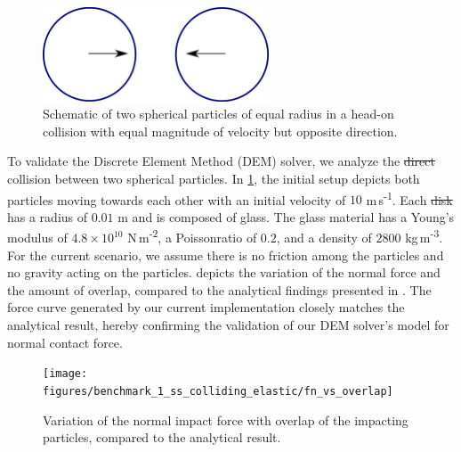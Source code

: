 \documentclass[preprint,12pt]{elsarticle}
\providecommand{\DIFaddtex}[1]{{\protect\color{blue}\uwave{#1}}} %
\providecommand{\DIFdeltex}[1]{{\protect\color{red}\sout{#1}}}                      %
\providecommand{\DIFaddbegin}{} %
\providecommand{\DIFaddend}{} %
\providecommand{\DIFdelbegin}{} %
\providecommand{\DIFdelend}{} %
\providecommand{\DIFaddbeginFL}{} %
\providecommand{\DIFaddendFL}{} %
\providecommand{\DIFdelbeginFL}{} %
\providecommand{\DIFdelendFL}{} %
\providecommand{\DIFadd}[1]{\texorpdfstring{\DIFaddtex{#1}}{#1}} %
\providecommand{\DIFdel}[1]{\texorpdfstring{\DIFdeltex{#1}}{}} %
\newcommand{\DIFscaledelfig}{0.5}
\newlength{\DIFdelgraphicswidth} %
\newlength{\DIFdelgraphicsheight} %
\newcommand{\DIFaddincludegraphics}[2][]{{\color{blue}\fbox{\DIFOincludegraphics[#1]{#2}}}} %
\newcommand{\DIFdelincludegraphics}[2][]{%
\sbox{\DIFdelgraphicsbox}{\DIFOincludegraphics[#1]{#2}}%
\settoboxwidth{\DIFdelgraphicswidth}{\DIFdelgraphicsbox} %
\settoboxtotalheight{\DIFdelgraphicsheight}{\DIFdelgraphicsbox} %
\scalebox{\DIFscaledelfig}{%
\parbox[b]{\DIFdelgraphicswidth}{\usebox{\DIFdelgraphicsbox}\\[-\baselineskip] \rule{\DIFdelgraphicswidth}{0em}}\llap{\resizebox{\DIFdelgraphicswidth}{\DIFdelgraphicsheight}{%
\setlength{\unitlength}{\DIFdelgraphicswidth}%
\begin{picture}(1,1)%
\thicklines\linethickness{2pt} %
{\color[rgb]{1,0,0}\put(0,0){\framebox(1,1){}}}%
{\color[rgb]{1,0,0}\put(0,0){\line( 1,1){1}}}%
{\color[rgb]{1,0,0}\put(0,1){\line(1,-1){1}}}%
\end{picture}%
}\hspace*{3pt}}} %
} %
\DeclareRobustCommand{\DIFaddbegin}{\DIFOaddbegin \let\includegraphics\DIFaddincludegraphics} %
\DeclareRobustCommand{\DIFaddend}{\DIFOaddend \let\includegraphics\DIFOincludegraphics} %
\DeclareRobustCommand{\DIFdelbegin}{\DIFOdelbegin \let\includegraphics\DIFdelincludegraphics} %
\DeclareRobustCommand{\DIFdelend}{\DIFOaddend \let\includegraphics\DIFOincludegraphics} %
\DeclareRobustCommand{\DIFaddbeginFL}{\DIFOaddbeginFL \let\includegraphics\DIFaddincludegraphics} %
\DeclareRobustCommand{\DIFaddendFL}{\DIFOaddendFL \let\includegraphics\DIFOincludegraphics} %
\DeclareRobustCommand{\DIFdelbeginFL}{\DIFOdelbeginFL \let\includegraphics\DIFdelincludegraphics} %
\DeclareRobustCommand{\DIFdelendFL}{\DIFOaddendFL \let\includegraphics\DIFOincludegraphics} %
\begin{document}
\begin{figure}[!htpb]
  \centering
  \includegraphics[width=0.6\textwidth]{images/results_dem_1_validation_particle_particle_impact/dem_01_head_on_schematic}
  \caption{Schematic of two spherical particles of equal radius in a
    head-on collision with equal magnitude of velocity but opposite direction.}
  \label{fig:result:dem_1_schematic}
\end{figure}
To validate the Discrete Element Method (DEM) solver, we analyze the \DIFdelbegin \DIFdel{direct
}\DIFdelend \DIFaddbegin \DIFadd{normal
}\DIFaddend collision between two spherical particles.  In
\cref{fig:result:dem_1_schematic}, the initial setup depicts both particles
moving towards each other with an initial velocity of $10$
m\,s\textsuperscript{-1}.  Each \DIFdelbegin \DIFdel{disk }\DIFdelend \DIFaddbegin \DIFadd{particle }\DIFaddend has a radius of $0.01$ m and is composed
of glass. The glass material has a Young's modulus of $4.8 \times 10^{10}$
N\,m\textsuperscript{-2}, a Poisson\DIFaddbegin \DIFadd{'s }\DIFaddend ratio of $0.2$, and a density of \DIFdelbegin \DIFdel{$2800$
}\DIFdelend \DIFaddbegin \DIFadd{$2,800$
}\DIFaddend kg\,m\textsuperscript{-3}.  For the current scenario, we assume there is no
friction among the particles and no gravity acting on the particles.
 depicts the variation of the normal
force and the amount of overlap, compared to the analytical findings presented
in \cite{chung2011benchmark}. The force curve generated by our current
implementation closely matches the analytical result, hereby confirming the
validation of our DEM solver's model for normal contact force.
\begin{figure}[!htpb]
  \centering
  \DIFdelbeginFL %
\DIFdelendFL \DIFaddbeginFL \texttt{[image: figures/benchmark\_1\_ss\_colliding\_elastic/fn\_vs\_overlap]}
  \DIFaddendFL \caption{Variation of the normal impact force with overlap of the impacting
    particles, compared to the analytical result.}
  \label{fig:result:dem_1_force_vs_overlap}
\end{figure}
\end{document}
